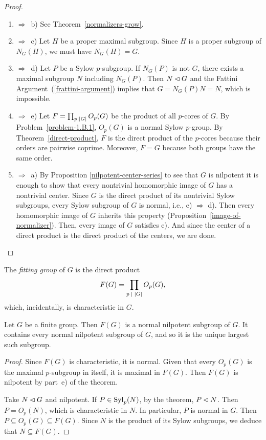 \begin{proof}${}$

\begin{enumerate}[\upshape a)]
    \item $\Rightarrow$~b) See Theorem~\ref{normalizers-grow}.
    \item $\Rightarrow$~c) Let $H$ be a proper maximal subgroup. Since $H$ is a proper subgroup of $N_G(H)$, we must have $N_G(H)=G$.
    \item $\Rightarrow$~d) Let $P$ be a Sylow $p$-subgroup. If $N_G(P)$ is not $G$, there exists a maximal subgroup $N$ including $N_G(P)$. Then $N\lhd G$ and the Fattini Argument~(\ref{frattini-argument}) implies that $G=N_G(P)N=N$, which is impossible.
    \item $\Rightarrow$~e) Let $F=\prod_{p\mid\left\vert{G}\right\vert}O_p(G)$ be the product of all $p$-cores of $G$. By Problem~\ref{problem-1.B.1}, $O_p(G)$ is a normal Sylow $p$-group. By Theorem~\ref{direct-product}, $F$ is the direct product of the $p$-cores because their orders are pairwise coprime. Moreover, $F=G$ because both groups have the same order.
    \item $\Rightarrow$~a) By Proposition \ref{nilpotent-center-series} to see that $G$ is nilpotent it is enough to show that every nontrivial homomorphic image of $G$ has a nontrivial center. Since $G$ is the direct product of its nontrivial Sylow subgroups, every Sylow subgroup of $G$ is normal, i.e., e) $\Rightarrow$ d). Then every homomorphic image of $G$ inherits this property (Proposition~\ref{image-of-normalizer}). Then, every image of $G$ satisfies e). And since the center of a direct product is the direct product of the centers, we are done.
\end{enumerate}
\end{proof}

\begin{defn}
    The \textsl{fitting group} of\/ $G$ is the direct product
    $$
        F(G)=\prod_{p\;\mid\;\left\vert{G}\right\vert}O_p(G),
    $$
    which, incidentally, is characteristic in\/ $G$.
\end{defn}

\begin{cor}\label{normal-nilpotent-fitting}
    Let\/ $G$ be a finite group. Then\/ $F(G)$ is a normal nilpotent subgroup of\/ $G$. It contains every normal nilpotent subgroup of\/ $G$, and so it is the unique largest such subgroup.
\end{cor}

\begin{proof} Since $F(G)$ is characteristic, it is normal. Given that every $O_p(G)$ is the maximal $p$-subgroup in itself, it is maximal in $F(G)$. Then $F(G)$ is nilpotent by part~e) of the theorem.

Take $N\lhd G$ and nilpotent. If $P\in{\rm Syl}_p(N)$, by the theorem, $P\lhd N$. Then $P=O_p(N)$, which is characteristic in $N$. In particular, $P$ is normal in $G$. Then $P\subseteq O_p(G)\subseteq F(G)$. Since $N$ is the product of its Sylow subgroups, we deduce that $N\subseteq F(G)$.  \end{proof}

